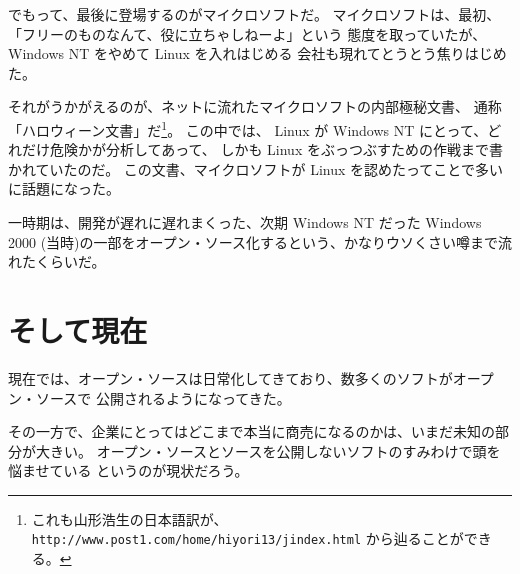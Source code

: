 \documentclass[11pt]{jarticle}
\begin{document}
でもって、最後に登場するのがマイクロソフトだ。
マイクロソフトは、最初、「フリーのものなんて、役に立ちゃしねーよ」という
態度を取っていたが、 Windows NT をやめて Linux を入れはじめる
会社も現れてとうとう焦りはじめた。

それがうかがえるのが、ネットに流れたマイクロソフトの内部極秘文書、
通称「ハロウィーン文書」だ\footnote{これも山形浩生の日本語訳が、
\texttt{http://www.post1.com/home/hiyori13/jindex.html} から辿ることができる。}。
この中では、 Linux が Windows NT にとって、どれだけ危険かが分析してあって、
しかも Linux をぶっつぶすための作戦まで書かれていたのだ。
この文書、マイクロソフトが Linux を認めたってことで多いに話題になった。

一時期は、開発が遅れに遅れまくった、次期 Windows NT だった Windows 2000 
(当時)の一部をオープン・ソース化するという、かなりウソくさい噂まで流れたくらいだ。

\section{そして現在}

現在では、オープン・ソースは日常化してきており、数多くのソフトがオープン・ソースで
公開されるようになってきた。

その一方で、企業にとってはどこまで本当に商売になるのかは、いまだ未知の部分が大きい。
オープン・ソースとソースを公開しないソフトのすみわけで頭を悩ませている
というのが現状だろう。
\end{document}
